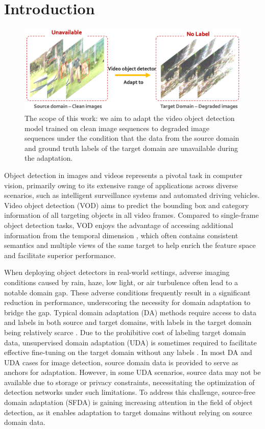 \section{Introduction}
\label{sec:intro}
\begin{figure}
    \centering
    \includegraphics[width = 0.95\linewidth]{figures/overview.png}
    \caption{The scope of this work: we aim to adapt the video object detection model trained on clean image sequences to degraded image sequences under the condition that the data from the source domain and ground truth labels of the target domain are unavailable during the adaptation.}
    \label{fig:overview}
\end{figure}

Object detection in images and videos represents a pivotal task in computer vision, primarily owing to its extensive range of applications across diverse scenarios, such as intelligent surveillance systems and automated driving vehicles. Video object detection (VOD) aims to predict the bounding box and category information of all targeting objects in all video frames. Compared to single-frame object detection tasks, VOD enjoys the advantage of accessing additional information from the temporal dimension \cite{zhu2017flow, shi2023yolov}, which often contains consistent semantics and multiple views of the same target to help enrich the feature space and facilitate superior performance.  


When deploying object detectors in real-world settings, adverse imaging conditions caused by rain, haze, low light, or air turbulence often lead to a notable domain gap. These adverse conditions frequently result in a significant reduction in performance, underscoring the necessity for domain adaptation to bridge the gap. Typical domain adaptation (DA) methods require access to data and labels in both source and target domains, with labels in the target domain being relatively scarce \cite{adp_vp}. Due to the prohibitive cost of labeling target domain data, unsupervised domain adaptation (UDA) is sometimes required to facilitate effective fine-tuning on the target domain without any labels \cite{oza2023unsupervised}. In most DA and UDA cases for image detection, source domain data is provided to serve as anchors for adaptation. However, in some UDA scenarios, source data may not be available due to storage or privacy constraints, necessitating the optimization of detection networks under such limitations. To address this challenge, source-free domain adaptation (SFDA) is gaining increasing attention in the field of object detection, as it enables adaptation to target domains without relying on source domain data. 

